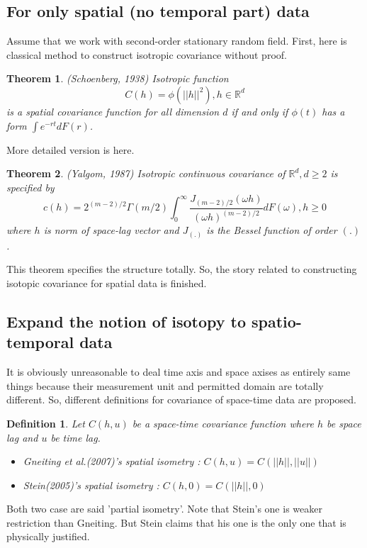 \documentclass{article}
\newtheorem*{theorem}{Theorem}
\newtheorem*{definition}{Definition}
\begin{document}
\subsection{For only spatial (no temporal part) data}
Assume that we work with second-order stationary random field.
First, here is classical method to construct isotropic covariance without proof.
\begin{theorem}{(Schoenberg, 1938)}
    Isotropic function
    \[C(h)=\phi(||h||^2),h\in\mathbb R^d\]
    is a spatial covariance function for all dimension $d$ if and only if $\phi(t)$ has a form $\int e^{-rt}dF(r)$.
\end{theorem}
More detailed version is here.
\begin{theorem}{(Yalgom, 1987)}
    Isotropic continuous covariance of $\mathbb R^d, d\geq 2$ is specified by
    \[c(h)=2^{(m-2)/2} \Gamma(m/2) \int_0^\infty \frac{J_{(m-2)/2}(\omega h)}{(\omega h)^{(m-2)/2}}dF(\omega), h\geq 0\]
    where $h$ is norm of space-lag vector and $J_(.)$ is the Bessel function of order $(.)$.
\end{theorem}
This theorem specifies the structure totally. So, the story related to constructing isotopic covariance for spatial data is finished.



\subsection{Expand the notion of isotopy to spatio-temporal data}
It is obviously unreasonable to deal time axis and space axises as entirely same things because their measurement unit and permitted domain are totally different.
So, different definitions for covariance of space-time data are proposed. 

\begin{definition}
    Let $C(h,u)$ be a space-time covariance function where $h$ be space lag and $u$ be time lag.
    \begin{itemize}
        \item Gneiting et al.(2007)'s spatial isometry : $C(h,u)=C(||h||,||u||)$
        \item Stein(2005)'s spatial isometry : $C(h,0)=C(||h||,0)$
    \end{itemize}    
\end{definition}
Both two case are said 'partial isometry'.
Note that Stein's one is weaker restriction than Gneiting. But Stein claims that his one is the only one that is physically justified.
\end{document}
